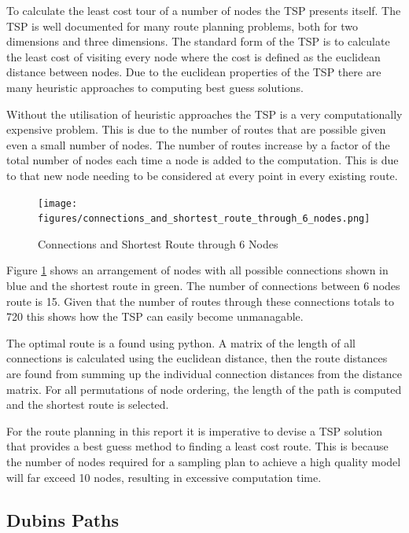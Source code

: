 \documentclass[a4paper,12pt,twoside]{article}
\begin{document}
To calculate the least cost tour of a number of nodes the TSP presents itself. The TSP is well documented for many route planning problems, both for two dimensions and three dimensions. The standard form of the TSP is to calculate the least cost of visiting every node where the cost is defined as the euclidean distance between nodes. Due to the euclidean properties of the TSP there are many heuristic approaches to computing best guess solutions.

Without the utilisation of heuristic approaches the TSP is a very computationally expensive problem. This is due to the number of routes that are possible given even a small number of nodes. The number of routes increase by a factor of the total number of nodes each time a node is added to the computation. This is due to that new node needing to be considered at every point in every existing route.

\begin{figure}
\centering
\texttt{[image: figures/connections\_and\_shortest\_route\_through\_6\_nodes.png]} 
\caption{Connections and Shortest Route through 6 Nodes}
\label{fig:connections_and_shortest_route_through_6_nodes}
\end{figure}

Figure \ref{fig:connections_and_shortest_route_through_6_nodes} shows an arrangement of nodes with all possible connections shown in blue and the shortest route in green. The number of connections between 6 nodes route is 15. Given that the number of routes through these connections totals to 720 this shows how the TSP can easily become unmanagable.

The optimal route is a found using python. A matrix of the length of all connections is calculated using the euclidean distance, then the route distances are found from summing up the individual connection distances from the distance matrix. For all permutations of node ordering, the length of the path is computed and the shortest route is selected.

For the route planning in this report it is imperative to devise a TSP solution that provides a best guess method to finding a least cost route. This is because the number of nodes required for a sampling plan to achieve a high quality model will far exceed 10 nodes, resulting in excessive computation time.

\subsection{Dubins Paths}
\label{sec:dubins_paths}
\end{document}
